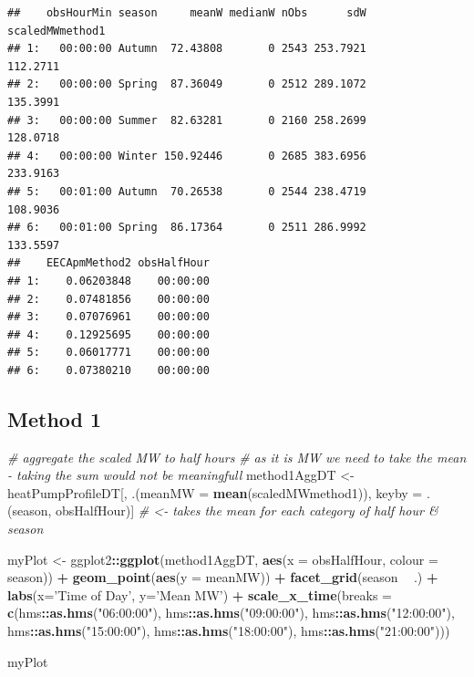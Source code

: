 \documentclass[]{article}
\newenvironment{Shaded}{\begin{snugshade}}{\end{snugshade}}
\newcommand{\KeywordTok}[1]{\textcolor[rgb]{0.13,0.29,0.53}{\textbf{#1}}}
\newcommand{\DataTypeTok}[1]{\textcolor[rgb]{0.13,0.29,0.53}{#1}}
\newcommand{\StringTok}[1]{\textcolor[rgb]{0.31,0.60,0.02}{#1}}
\newcommand{\CommentTok}[1]{\textcolor[rgb]{0.56,0.35,0.01}{\textit{#1}}}
\newcommand{\OperatorTok}[1]{\textcolor[rgb]{0.81,0.36,0.00}{\textbf{#1}}}
\newcommand{\NormalTok}[1]{#1}
\theoremstyle{definition}
\theoremstyle{definition}
\theoremstyle{definition}
\theoremstyle{remark}
\begin{document}
\begin{verbatim}
##    obsHourMin season     meanW medianW nObs      sdW scaledMWmethod1
## 1:   00:00:00 Autumn  72.43808       0 2543 253.7921        112.2711
## 2:   00:00:00 Spring  87.36049       0 2512 289.1072        135.3991
## 3:   00:00:00 Summer  82.63281       0 2160 258.2699        128.0718
## 4:   00:00:00 Winter 150.92446       0 2685 383.6956        233.9163
## 5:   00:01:00 Autumn  70.26538       0 2544 238.4719        108.9036
## 6:   00:01:00 Spring  86.17364       0 2511 286.9992        133.5597
##    EECApmMethod2 obsHalfHour
## 1:    0.06203848    00:00:00
## 2:    0.07481856    00:00:00
## 3:    0.07076961    00:00:00
## 4:    0.12925695    00:00:00
## 5:    0.06017771    00:00:00
## 6:    0.07380210    00:00:00
\end{verbatim}

\subsection{Method 1}\label{method-1}

\begin{Shaded}
\begin{Highlighting}[]
\CommentTok{# aggregate the scaled MW to half hours}
\CommentTok{# as it is MW we need to take the mean - taking the sum would not be meaningfull}
\NormalTok{method1AggDT <-}\StringTok{ }\NormalTok{heatPumpProfileDT[, .(}\DataTypeTok{meanMW =} \KeywordTok{mean}\NormalTok{(scaledMWmethod1)), }
\NormalTok{                                  keyby =}\StringTok{ }\NormalTok{.(season, obsHalfHour)] }\CommentTok{# <- takes the mean for each category of half hour & season}

\NormalTok{myPlot <-}\StringTok{ }\NormalTok{ggplot2}\OperatorTok{::}\KeywordTok{ggplot}\NormalTok{(method1AggDT, }\KeywordTok{aes}\NormalTok{(}\DataTypeTok{x =}\NormalTok{ obsHalfHour, }\DataTypeTok{colour =}\NormalTok{ season)) }\OperatorTok{+}
\StringTok{  }\KeywordTok{geom_point}\NormalTok{(}\KeywordTok{aes}\NormalTok{(}\DataTypeTok{y =}\NormalTok{ meanMW)) }\OperatorTok{+}
\StringTok{  }\KeywordTok{facet_grid}\NormalTok{(season }\OperatorTok{~}\StringTok{ }\NormalTok{.) }\OperatorTok{+}
\StringTok{  }\KeywordTok{labs}\NormalTok{(}\DataTypeTok{x=}\StringTok{'Time of Day'}\NormalTok{, }\DataTypeTok{y=}\StringTok{'Mean MW'}\NormalTok{) }\OperatorTok{+}
\StringTok{  }\KeywordTok{scale_x_time}\NormalTok{(}\DataTypeTok{breaks =} \KeywordTok{c}\NormalTok{(hms}\OperatorTok{::}\KeywordTok{as.hms}\NormalTok{(}\StringTok{"06:00:00"}\NormalTok{), hms}\OperatorTok{::}\KeywordTok{as.hms}\NormalTok{(}\StringTok{"09:00:00"}\NormalTok{), hms}\OperatorTok{::}\KeywordTok{as.hms}\NormalTok{(}\StringTok{"12:00:00"}\NormalTok{), }
\NormalTok{                          hms}\OperatorTok{::}\KeywordTok{as.hms}\NormalTok{(}\StringTok{"15:00:00"}\NormalTok{), hms}\OperatorTok{::}\KeywordTok{as.hms}\NormalTok{(}\StringTok{"18:00:00"}\NormalTok{), hms}\OperatorTok{::}\KeywordTok{as.hms}\NormalTok{(}\StringTok{"21:00:00"}\NormalTok{)))}

\NormalTok{myPlot}
\end{Highlighting}
\end{Shaded}
\end{document}
